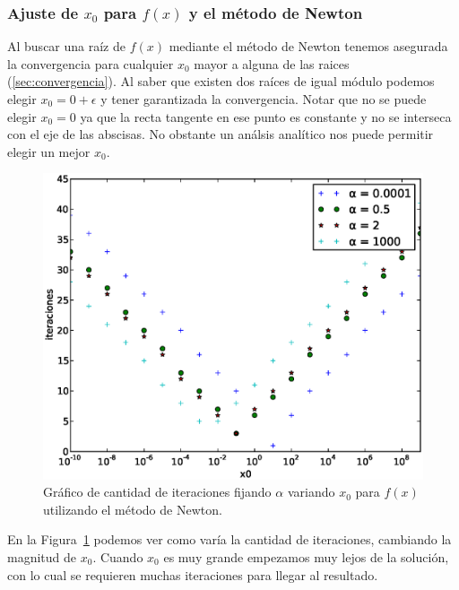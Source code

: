 \subsubsection{Ajuste de $x_0$ para $f(x)$ y el método de Newton}

Al buscar una raíz de $f(x)$ mediante el método de Newton tenemos asegurada la
convergencia para cualquier $x_0$ mayor a alguna de las raices
(\ref{sec:convergencia}). Al saber que existen dos raíces de igual módulo
podemos elegir $x_0 = 0 + \epsilon$ y tener garantizada la convergencia. Notar
que no se puede elegir $x_0 = 0$ ya que la recta tangente en ese punto es
constante y no se interseca con el eje de las abscisas. No obstante un análsis
analítico nos puede permitir elegir un mejor $x_0$.

\begin{figure}[!htbp]
  \begin{center}
    \includegraphics[scale=0.5]{graficos/new/f_newton_x0_variable.eps}
    \caption{\label{fig:f_newton_x0_variable} Gráfico de cantidad de iteraciones fijando $\alpha$ variando $x_0$ para $f(x)$ utilizando el método de Newton.}
  \end{center}
\end{figure}

En la Figura~\ref{fig:f_newton_x0_variable}  podemos ver como varía la cantidad
de iteraciones, cambiando la magnitud de $x_0$. Cuando $x_0$ es muy grande
empezamos muy lejos de la solución, con lo cual se requieren muchas iteraciones
para llegar al resultado.\\

